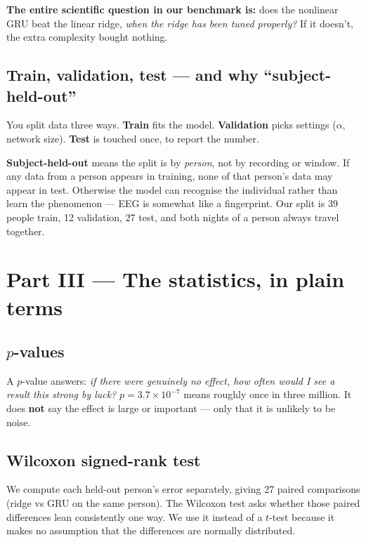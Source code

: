 \documentclass[11pt]{article}
\begin{document}
\begin{keybox}
\textbf{The entire scientific question in our benchmark is:} does the nonlinear
GRU beat the linear ridge, \emph{when the ridge has been tuned properly?} If it
doesn't, the extra complexity bought nothing.
\end{keybox}

\subsection{Train, validation, test --- and why ``subject-held-out''}

You split data three ways. \textbf{Train} fits the model. \textbf{Validation}
picks settings ($\alpha$, network size). \textbf{Test} is touched once, to report
the number.

\textbf{Subject-held-out} means the split is by \emph{person}, not by recording or
window. If any data from a person appears in training, none of that person's data
may appear in test. Otherwise the model can recognise the individual rather than
learn the phenomenon --- EEG is somewhat like a fingerprint. Our split is 39
people train, 12 validation, 27 test, and both nights of a person always travel
together.

\section{Part III --- The statistics, in plain terms}

\subsection{$p$-values}

A $p$-value answers: \emph{if there were genuinely no effect, how often would I see
a result this strong by luck?} $p = 3.7\times10^{-7}$ means roughly once in three
million. It does \textbf{not} say the effect is large or important --- only that it
is unlikely to be noise.

\subsection{Wilcoxon signed-rank test}

We compute each held-out person's error separately, giving 27 paired comparisons
(ridge vs GRU on the same person). The Wilcoxon test asks whether those paired
differences lean consistently one way. We use it instead of a $t$-test because it
makes no assumption that the differences are normally distributed.
\end{document}
